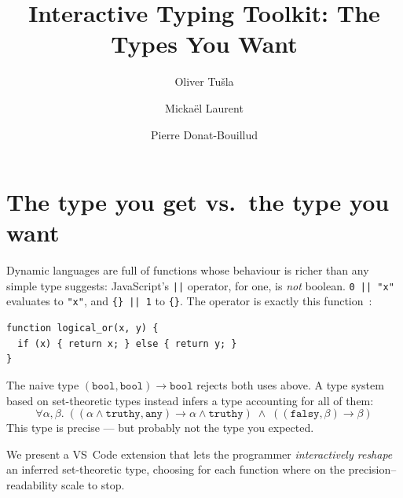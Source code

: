 \documentclass[sigplan,screen]{acmart}
\newcommand{\ttt}[1]{\texttt{#1}}
\begin{document}
\title{Interactive Typing Toolkit: The Types You Want}

\author{Oliver Tu\v{s}la}

\author{Micka\"el Laurent}

\author{Pierre Donat-Bouillud}




\maketitle

\section{The type you get vs.\ the type you want}

Dynamic languages are full of functions whose behaviour is richer
than any simple type suggests: JavaScript's \ttt{||} operator, for
one, is \emph{not} boolean.  \ttt{0 || "x"} evaluates to \ttt{"x"},
and \ttt{\{\} || 1} to \ttt{\{\}}. The operator is
exactly this function~\cite{polymorphic-inference}:

\begin{lstlisting}[morekeywords={function,if,else,return}]
function logical_or(x, y) {
  if (x) { return x; } else { return y; }
}
\end{lstlisting}

The naive type $(\ttt{bool}, \ttt{bool}) \rightarrow \ttt{bool}$
rejects both uses above.  A type system based on set-theoretic types
instead infers a type accounting for all of
them:
\[
  \forall \alpha, \beta.\;
  ((\alpha \wedge \ttt{truthy}, \ttt{any}) \rightarrow \alpha \wedge \ttt{truthy})
  \;\wedge\;
  ((\ttt{falsy}, \beta) \rightarrow \beta)
\]
This type is precise --- but probably not the
type you expected.

We present a VS~Code extension that lets the programmer
\emph{interactively reshape} an inferred set-theoretic type,
choosing for each function where on the precision--readability scale
to stop.
\end{document}
